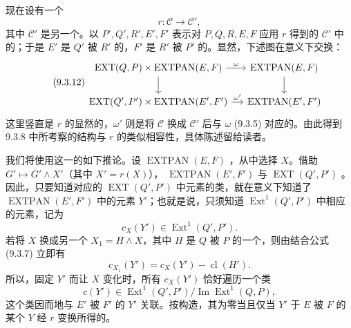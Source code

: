 现在设有一个
\begin{equation}\tag{9.3.11}
 r:\mathcal C\longrightarrow\mathcal C',
\end{equation}
其中 $\mathcal C'$ 是另一个。以 $P',Q',R',E',F'$ 表示对 $P,Q,R,E,F$ 应用 $r$ 得到的 $\mathcal C'$ 中的；于是 $E'$ 是 $Q'$ 被 $R'$ 的，$F'$ 是 $R'$ 被 $P'$ 的。显然，下述图在意义下交换：
\begin{equation}\tag{9.3.12}
\begin{tikzcd}[column sep=small]
 \operatorname{EXT}(Q,P)\times\operatorname{EXTPAN}(E,F) \arrow[r,"\omega"] \arrow[d]
 & \operatorname{EXTPAN}(E,F) \arrow[d]\\
 \operatorname{EXT}(Q',P')\times\operatorname{EXTPAN}(E',F') \arrow[r,"\omega'"]
 & \operatorname{EXTPAN}(E',F')
\end{tikzcd}
\end{equation}
这里竖直是 $r$ 的显然的，$\omega'$ 则是将 $\mathcal C$ 换成 $\mathcal C'$ 后与 $\omega$ (9.3.5) 对应的。由此得到 9.3.8 中所考察的结构与 $r$ 的类似相容性，具体陈述留给读者。

我们将使用这一的如下推论。设 $\operatorname{EXTPAN}(E,F)$ ，从中选择 $X$。借助 $G'\mapsto G'\wedge X'$（其中 $X'=r(X)$）， $\operatorname{EXTPAN}(E',F')$ 与 $\operatorname{EXT}(Q',P')$ 。因此，只要知道对应的 $\operatorname{EXT}(Q',P')$ 中元素的类，就在意义下知道了 $\operatorname{EXTPAN}(E',F')$ 中的元素 $Y'$；也就是说，只须知道 $\operatorname{Ext}^1(Q',P')$ 中相应的元素，记为
\[
 c_X(Y')\in\operatorname{Ext}^1(Q',P').
\]
若将 $X$ 换成另一个 $X_1=H\wedge X$，其中 $H$ 是 $Q$ 被 $P$ 的一个，则由结合公式 (9.3.7) 立即有
\[
 c_{X_1}(Y')=c_X(Y')-\operatorname{cl}(H').
\]
所以，固定 $Y'$ 而让 $X$ 变化时，所有 $c_X(Y')$ 恰好遍历一个类
\begin{equation}\tag{9.3.13}
 c(Y')\in\operatorname{Ext}^1(Q',P')/\operatorname{Im}\operatorname{Ext}^1(Q,P),
\end{equation}
这个类因而地与 $E'$ 被 $F'$ 的 $Y'$ 关联。按构造，其为零当且仅当 $Y'$ 于 $E$ 被 $F$ 的某个 $Y$ 经 $r$ 变换所得的。

